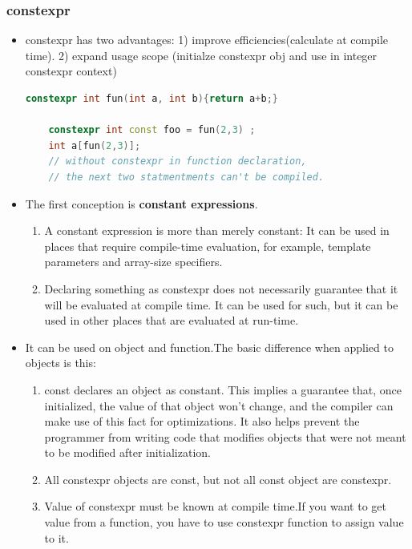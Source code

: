 \documentclass[a4paper,12pt,twoside]{book}
\begin{document}
\subsubsection{constexpr}
\begin{itemize}
    \item constexpr has two advantages: 1) improve efficiencies(calculate at compile time). 2) expand usage scope (initialze constexpr obj and use in integer constexpr context)
    \begin{lstlisting}[frame=single, language=c++]
    constexpr int fun(int a, int b){return a+b;}
    
    constexpr int const foo = fun(2,3) ;
    int a[fun(2,3)];
    // without constexpr in function declaration,
    // the next two statmentments can't be compiled. 
    \end{lstlisting}
    \item The first conception is \textbf{constant expressions}. 
    \begin{enumerate}
        \item A constant expression is more than merely constant: It can be used in places that require compile-time evaluation, for example, template parameters and array-size specifiers.
        
        \item Declaring something as constexpr does not necessarily guarantee that it will be evaluated at compile time. It can be used for such, but it can be used in other places that are evaluated at run-time.
    \end{enumerate}

	\item It can be used on object and function.The basic difference when applied to objects is this:
    \begin{enumerate}
        \item const declares an object as constant. This implies a guarantee that, once initialized, the value of that object won't change, and the compiler can make use of this fact for optimizations. It also helps prevent the programmer from writing code that modifies objects that were not meant to be modified after initialization.


        \item All constexpr objects are const, but not all const object are constexpr.
        
        \item Value of constexpr must be known at compile time.If you want to get value from a function, you have to use constexpr function to assign value to it. 
    \end{enumerate}


\end{itemize}
\end{document}
